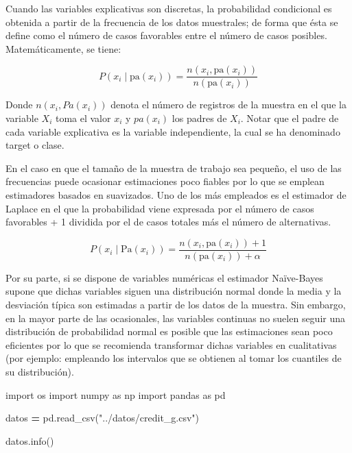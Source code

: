 \documentclass[
  a4paper,
  DIV=11,
  numbers=noendperiod]{scrreprt}
\newenvironment{Shaded}{\begin{snugshade}}{\end{snugshade}}
\newcommand{\ImportTok}[1]{#1}
\newcommand{\NormalTok}[1]{#1}
\newcommand{\OperatorTok}[1]{\textcolor[rgb]{0.81,0.36,0.00}{\textbf{#1}}}
\newcommand{\StringTok}[1]{\textcolor[rgb]{0.31,0.60,0.02}{#1}}
\begin{document}
Cuando las variables explicativas son discretas, la probabilidad
condicional es obtenida a partir de la frecuencia de los datos
muestrales; de forma que ésta se define como el número de casos
favorables entre el número de casos posibles. Matemáticamente, se tiene:

\[P(x_i \mid \text{pa}(x_i)) = \frac{n(x_i, \text{pa}(x_i))}{n(\text{pa}(x_i))}\]

Donde \(n(x_i, Pa(x_i ))\) denota el número de registros de la muestra
en el que la variable \(X_i\) toma el valor \(x_i\) y \(pa(x_i )\) los
padres de \(X_i\). Notar que el padre de cada variable explicativa es la
variable independiente, la cual se ha denominado target o clase.

En el caso en que el tamaño de la muestra de trabajo sea pequeño, el uso
de las frecuencias puede ocasionar estimaciones poco fiables por lo que
se emplean estimadores basados en suavizados. Uno de los más empleados
es el estimador de Laplace en el que la probabilidad viene expresada por
el número de casos favorables + 1 dividida por el de casos totales más
el número de alternativas.

\[P(x_i \mid \text{Pa}(x_i)) = \frac{n(x_i, \text{pa}(x_i)) + 1}{n(\text{pa}(x_i)) + \alpha}\]

Por su parte, si se dispone de variables numéricas el estimador
Naïve-Bayes supone que dichas variables siguen una distribución normal
donde la media y la desviación típica son estimadas a partir de los
datos de la muestra. Sin embargo, en la mayor parte de las ocasionales,
las variables continuas no suelen seguir una distribución de
probabilidad normal es posible que las estimaciones sean poco eficientes
por lo que se recomienda transformar dichas variables en cualitativas
(por ejemplo: empleando los intervalos que se obtienen al tomar los
cuantiles de su distribución).

\begin{Shaded}
\begin{Highlighting}[numbers=left,,]
\ImportTok{import}\NormalTok{ os}
\ImportTok{import}\NormalTok{ numpy }\ImportTok{as}\NormalTok{ np}
\ImportTok{import}\NormalTok{ pandas }\ImportTok{as}\NormalTok{ pd}

\NormalTok{datos }\OperatorTok{=}\NormalTok{ pd.read\_csv(}\StringTok{"../datos/credit\_g.csv"}\NormalTok{)}

\NormalTok{datos.info()}
\end{Highlighting}
\end{Shaded}
\end{document}
